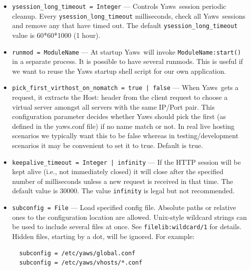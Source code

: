 \documentclass[11pt,oneside,english]{book}
\newcommand{\Yaws}            %
        {{\sc Yaws}}
\begin{document}
\begin{itemize}
\item       \verb+ysession_long_timeout = Integer+ ---
               Controls \Yaws\ session periodic cleanup. Every \hfill \break
               \verb+ysession_long_timeout+ milliseconds, check all
               \Yaws\ sessions and remove any that have timed out. The
               default \verb+ysession_long_timeout+ value is 60*60*1000 (1
               hour).

\item        \verb+runmod = ModuleName+ ---
               At startup \Yaws\ will invoke \verb+ModuleName:start()+ in a
               separate process. It is possible to have several runmods.  This
               is useful if we want to reuse the Yaws startup shell script for
               our own application.

\item        \verb+pick_first_virthost_on_nomatch = true | false+ ---
              When \Yaws\ gets a request, it extracts the Host: header from the
              client request to choose a virtual server amongst all servers with
              the same IP/Port pair.  This configuration parameter decides
              whether Yaws should pick the first (as defined in the yaws.conf
              file) if no name match or not.  In real live hosting scenarios we
              typically want this to be false whereas in testing/development
              scenarios it may be convenient to set it to true. Default is true.


\item        \verb+keepalive_timeout = Integer | infinity+ ---
              If the HTTP session will be kept alive (i.e., not
              immediately closed) it will close after the specified
              number of milliseconds unless a new request is received
              in that time. The default value is 30000. The value
              \verb+infinity+ is legal but not recommended.

\item        \verb+subconfig = File+ ---
              Load specified config file.  Absolute paths or relative ones to
              the configuration location are allowed. Unix-style wildcard
              strings can be used to include several files at once. See
              \verb+filelib:wildcard/1+ for details. Hidden files, starting by a
              dot, will be ignored. For example:

\begin{verbatim}
  subconfig = /etc/yaws/global.conf
  subconfig = /etc/yaws/vhosts/*.conf
\end{verbatim}


\end{itemize}
\end{document}
